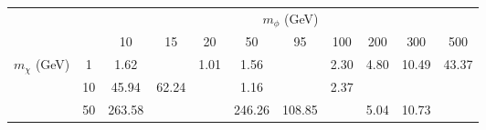 \begin{tabular}{cc|ccccccccc} 
 & & \multicolumn{9}{c}{$m_\phi$ (GeV)} \\ 
& &10 & 15 & 20 & 50 & 95 & 100 & 200 & 300 & 500\\ 
 \hline \hline 
\multirow{3}{*}{$m_\chi$ (GeV)} & 1 & 1.62 &  & 1.01 & 1.56 &  & 2.30 & 4.80 & 10.49 & 43.37\\ 
 & 10 & 45.94 & 62.24 &  & 1.16 &  & 2.37 &  &  & \\ 
 & 50 & 263.58 &  &  & 246.26 & 108.85 &  & 5.04 & 10.73 & \\ 
 \end{tabular}